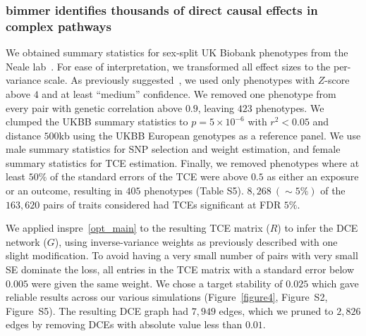 \documentclass{article}
\begin{document}
\subsubsection*{bimmer identifies thousands of direct causal effects in complex pathways}
We obtained summary statistics for sex-split UK Biobank phenotypes from
the Neale lab~\cite{NealeUKBB}. For ease of interpretation,
we transformed all effect sizes to the per-variance scale.
 As previously suggested~\cite{BulikSullivan2015,NealeUKBB},
we used only phenotypes with $Z$-score above $4$ and at least ``medium'' confidence.
 We removed one phenotype from every pair with genetic
correlation above $0.9$, leaving $423$ phenotypes. We clumped the UKBB
summary statistics to $p=5 \times 10^{-6}$ with $r^2 < 0.05$ and distance $500$kb using
the UKBB European genotypes as a reference panel. We use male summary statistics for SNP selection
and weight estimation, and female summary statistics for TCE estimation. Finally, we removed
phenotypes where at least $50\%$ of the standard errors of the TCE were above $0.5$
as either an exposure or an outcome, resulting in $405$ phenotypes (Table S5).
$8,268~(\sim 5\%)$ of the $163,620$ pairs of traits considered had TCEs significant at FDR $5\%$.

We applied inspre~\eqref{opt_main} to the resulting TCE matrix ($R$) to infer the DCE network ($G$),
 using inverse-variance weights
as previously described with one slight modification. To avoid having a very small
number of pairs with very small SE dominate the loss, all entries in the TCE matrix with
a standard error below $0.005$ were given the same weight.
We chose a target stability of $0.025$ which gave reliable results across our various simulations
(Figure~\ref{figure4}, Figure~S2, Figure~S5). The resulting DCE graph had $7,949$ edges,
which we pruned to $2,826$ edges by removing DCEs with absolute value less than $0.01$. 
\end{document}
